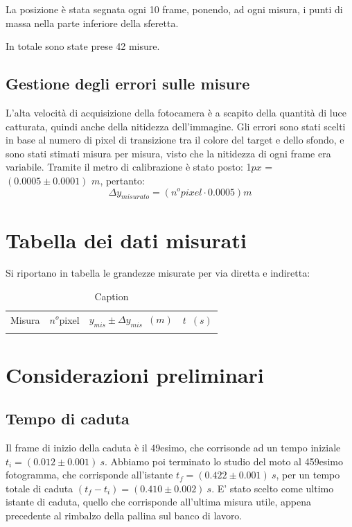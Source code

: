 \documentclass[12pt, a4paper]{article}
\begin{document}
La posizione è stata segnata ogni 10 frame, ponendo, ad ogni misura, i punti di massa nella parte inferiore della sferetta. 

In totale sono state prese 42 misure.


\subsection{Gestione degli errori sulle misure}
L'alta velocità di acquisizione della fotocamera è a scapito della quantità di luce catturata, quindi anche della nitidezza dell'immagine.
Gli errori sono stati scelti in base al numero di pixel di transizione tra il colore del target e dello sfondo, e sono stati stimati misura per misura, visto che la nitidezza di ogni frame era variabile. Tramite il metro di calibrazione è stato posto: 1$px$ = $(0.0005\pm 0.0001)$ $m$, pertanto:
\begin{equation*}
    \Delta y_{misurato}= (n^o pixel \cdot 0.0005)m
\end{equation*}

\bigskip

\section{Tabella dei dati misurati}

Si riportano in tabella le grandezze misurate per via diretta e indiretta:

\begin{table}[!h]
    \centering
    \begin{tabular}{|c|c|c|c|}
    \hline
    \multirow{2}{*}{\small Misura} 
    &\multirow{2}{*}{\small $n^o$pixel} 
    &\multirow{2}{*}{\small{$ y_{mis}\pm\Delta y_{mis}$\ $(m)$}} 
    &\multirow{2}{*}{\small$t$\ $(s)$} 
    \\
    &&&
    \\
    \hline
    \hline
       &  &  &\\
    \hline
    \end{tabular}
        \caption{Caption}
        \label{tab:Tabella dati misurati inizio}
\end{table}
\section{Considerazioni preliminari}

\subsection{Tempo di caduta}
Il frame di inizio della caduta è il 49esimo, che corrisonde ad un tempo iniziale \textit{$t_i = (0.012\pm 0.001)\ s$}.
Abbiamo poi terminato lo studio del moto al 459esimo fotogramma, che corrisponde all'istante \textit{$t_f = (0.422\pm 0.001)\ s$}, per un tempo totale di caduta \textit{$(t_f-t_i) = (0.410\pm 0.002)\ s$}. 
E' stato scelto come ultimo istante di caduta, quello che corrisponde all'ultima misura utile, appena precedente al rimbalzo della pallina sul banco di lavoro.\\
\end{document}
